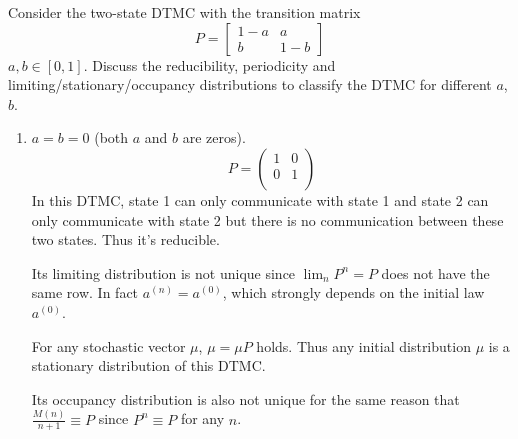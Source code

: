 \documentclass[  11pt]{article}
\begin{document}
\begin{ExerciseList}

\Exercise 
 Consider the two-state DTMC with the transition matrix 
 $$P = \begin{bmatrix} 1- a & a \\ b & 1-b \end{bmatrix}$$
$a,b\in [0,1]$. 
Discuss the reducibility, periodicity and limiting/stationary/occupancy distributions
to classify the DTMC for different $a$, $b$.



\Answer
\begin{enumerate}
\item  
$a=b=0$ (both $a$ and $b$ are zeros).
\[
P=\left(\begin{array}{cc}
1 &0\\
0 &1\\
\end{array}\right)
\]
In this DTMC, state 1 can only communicate with state 1   and state 2 can only communicate with state 2 but 
there is no communication between these two states. Thus   it's reducible. \par
Its  limiting distribution is not unique since $\lim_n P^n=P$ does not have the same row.
In fact $a^{(n)}=a^{(0)}$, which strongly depends on the initial law $a^{(0)}$.
\par
For any stochastic vector $\mu$, $\mu=\mu P$ holds. Thus any initial distribution $\mu$ is a stationary distribution of this DTMC.\par
Its occupancy distribution  is also not unique   for the same reason
that  $\frac{M(n)}{n+1}\equiv P$ since $P^n \equiv P$ for any $n$.

\par


\end{enumerate}
\end{ExerciseList}
\end{document}
